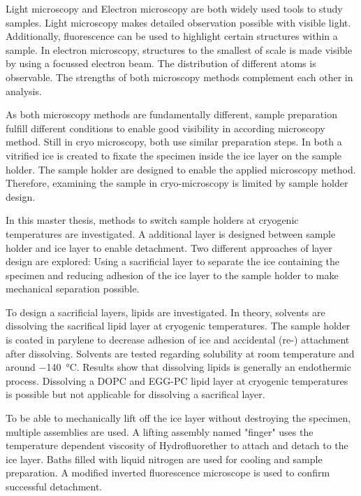 Light microscopy and Electron microscopy are both widely used tools to study samples. Light microscopy makes detailed observation possible with visible light. Additionally, fluorescence can be used to highlight certain structures within a sample. In electron microscopy, structures to the smallest of scale is made visible by using a focussed electron beam. The distribution of different atoms is observable. The strengths of both microscopy methods complement each other in analysis. 

As both microscopy methods are fundamentally different, sample preparation fulfill different conditions to enable good visibility in according microscopy method. Still in cryo microscopy, both use similar preparation steps. In both a vitrified ice  is created to fixate the specimen inside the ice layer on the sample holder. The sample holder are designed to enable the applied microscopy method. Therefore, examining the sample in cryo-microscopy is limited by sample holder design.

In this master thesis, methods to switch sample holders at cryogenic temperatures are investigated. A additional layer is designed between sample holder and ice layer to enable detachment. Two different approaches of layer design are explored: Using a sacrificial layer to separate the ice containing the specimen and reducing adhesion of the ice layer to the sample holder to make mechanical separation possible.

To design a sacrificial layers, lipids are investigated. In theory, solvents are dissolving the sacrifical lipid layer at cryogenic temperatures. The sample holder is coated in parylene to decrease adhesion of ice and accidental (re-) attachment after dissolving. Solvents are tested regarding solubility at room temperature and around \SI{-140}{\degreeCelsius}. Results show that dissolving lipids is generally an endothermic process. Dissolving a DOPC and EGG-PC lipid layer at cryogenic temperatures is possible but not applicable for dissolving a sacrifical layer. 

To be able to mechanically lift off the ice layer without destroying the specimen, multiple assemblies are used. A lifting assembly named "finger" uses the temperature dependent viscosity of Hydrofluorether to attach and detach to the ice layer. Baths filled with liquid nitrogen are used for cooling and sample preparation. A modified inverted fluorescence microscope is used to confirm successful detachment.

